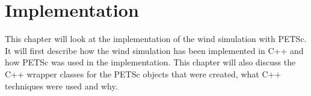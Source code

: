 \chapter{Implementation}
\label{chap:impl}

This chapter will look at the implementation of the wind simulation with PETSc.
It will first describe how the wind simulation has been implemented in C++ and
how PETSc was used in the implementation. This chapter will also discuss the
C++ wrapper classes for the PETSc objects that were created, what C++
techniques were used and why.





